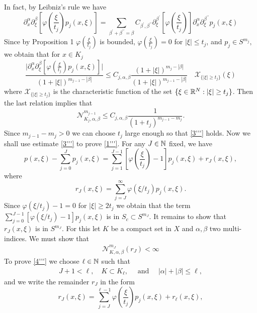 \documentclass[12pt,reqno]{amsart}
\theoremstyle{plain}  %
\theoremstyle{definition}
\newcommand{\nin}{\noindent}
\newcommand{\vph}{\varphi}
\begin{document}
In fact, by Leibniz's rule we have
$$\partial^\alpha_x \partial^\beta_\xi [\vph (\frac{\xi}{t_j}) p_j (x,
\xi)] = \sum_{\beta^\prime + \beta^{\prime \prime} = \beta}
C_{\beta^\prime, \beta^{\prime \prime}} \partial^{\beta^\prime}_\xi
[\vph (\frac{\xi}{t_j})] \partial^\alpha_x
\partial^{\beta^{\prime\prime}}_\xi p_j (x, \xi) $$
Since by Proposition 1 $ \vph (\frac{\xi}{t_j}) $ is bounded,  $ \vph
(\frac{\xi}{t_j}) = 0 $ for  $ |\xi| \le t_j$, and  $ p_j \in S^{m_j}, $ we obtain
that for $ x \in K_j $ 
$$\frac{\big |\partial^\alpha_x \partial^\beta_\xi[
\vph(\frac{\xi}{t_j})p_j(x, \xi)] \big|}{(1 + |\xi|)^{m_{j-1} - |\beta|}}
\le C_{j, \alpha, \beta} \frac{(1 + |\xi|)^{m_j - |\beta|}}{(1 +
|\xi|)^{m_{j-1}- |\beta|}} \quad   \mathcal X_{\{|\xi| \ge t_j\}} (\xi) $$
where $ \mathcal X_{\{|\xi| \ge t_j\}} $ is the characteristic function of the
set $ \{ \xi \in \Bbb R^N: |\xi| \ge t_j\}$.  Then the last relation implies
that
 $$\mathcal N_{K_j, \alpha, \beta}^{m_{j-1}} \le C_{j, \alpha, \beta}
\frac{1}{(1 + t_j)^{m_{j-1} -m_j}}. $$
Since $ m_{j-1} - m_j > 0 $ we can choose $ t_j $ large enough so that
\eqref{3'''} holds.  
\smallskip
\nin
Now we shall use estimate \eqref{3'''} to prove \eqref{1'''}.  For any $ J \in
\Bbb N $ fixed, we have
$$p(x, \xi) - \sum^J_{j=0} p_j(x, \xi) = \sum^{J-1}_{j=1} [\vph
(\frac{\xi}{t_j}) -1] p_j (x, \xi) + r_J (x, \xi),$$ 
where
$$r_J (x, \xi) = \sum^\infty_{j=J} \vph  
(\xi / t_j)  p_j (x, \xi). $$
Since $ \vph (\xi/t_j) -1 =0 $ for $ |\xi| \ge 2 t_j $ we obtain that
the term $ \sum^{J-1}_{j=0} [\vph (\xi/t_j) -1] p_j (x, \xi) $
is in $ S_c \subset S^{m_J}$.  It remains to show that
 $ r_J (x, \xi)$ is  in $S^{m_J}$.  
For this let $ K $ be
a compact set in $ X $ and $ \alpha, \beta $ two multi-indices.  We must
show that  
\begin{equation}
	\begin{split}
\mathcal N_{K, \alpha, \beta}^{m_J}  (r_J) < \infty 
		\label{4'''}
	\end{split}
\end{equation}
To prove \eqref{4'''} we choose $ \ell \in \Bbb N $
such that 
\begin{equation}
	\begin{split}
		J + 1 < \ell,\quad K \subset K_\ell, \quad\text{ and } 
\quad |\alpha| + |\beta| \le\ell, 
		\label{5'''}
	\end{split}
\end{equation}
and we write the remainder $ r_J$ in 
the form
 $$r_J (x, \xi) = \sum^{\ell - 1}_{j=J}
\vph (\frac{\xi}{t_j}) p_j (x, \xi) +r_\ell(x, \xi),$$ 
\end{document}

